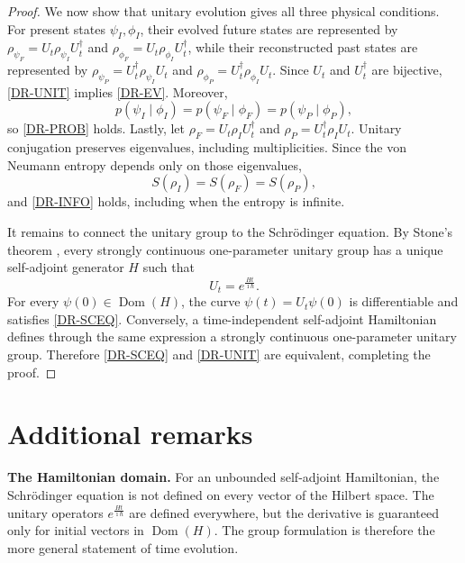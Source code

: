 \documentclass{techbrief}
\providecommand{\Dom}{\operatorname{Dom}}
\begin{document}
\begin{proof}
	We now show that unitary evolution gives all three physical conditions. For present states $\psi_I,\phi_I$, their evolved future states are represented by $\rho_{\psi_F}=U_t\rho_{\psi_I}U_t^\dagger$ and $\rho_{\phi_F}=U_t\rho_{\phi_I}U_t^\dagger$, while their reconstructed past states are represented by $\rho_{\psi_P}=U_t^\dagger\rho_{\psi_I}U_t$ and $\rho_{\phi_P}=U_t^\dagger\rho_{\phi_I}U_t$. Since $U_t$ and $U_t^\dagger$ are bijective, \ref{DR-UNIT} implies \ref{DR-EV}. Moreover,
	\begin{equation}
		p(\psi_I\mid\phi_I)=p(\psi_F\mid\phi_F)=p(\psi_P\mid\phi_P),
	\end{equation}
	so \ref{DR-PROB} holds. Lastly, let $\rho_F=U_t\rho_IU_t^\dagger$ and $\rho_P=U_t^\dagger\rho_IU_t$. Unitary conjugation preserves eigenvalues, including multiplicities. Since the von Neumann entropy depends only on those eigenvalues,
	\begin{equation}
		S(\rho_I)=S(\rho_F)=S(\rho_P),
	\end{equation}
	and \ref{DR-INFO} holds, including when the entropy is infinite.

	It remains to connect the unitary group to the Schrödinger equation. By Stone's theorem \cite[Theorem~5.73]{Landsman2017}, every strongly continuous one-parameter unitary group has a unique self-adjoint generator $H$ such that
	\begin{equation}
		U_t=e^{\frac{Ht}{\imath \hbar}}.
	\end{equation}
	For every $\psi(0)\in\Dom(H)$, the curve $\psi(t)=U_t\psi(0)$ is differentiable and satisfies \ref{DR-SCEQ}. Conversely, a time-independent self-adjoint Hamiltonian defines through the same expression a strongly continuous one-parameter unitary group. Therefore \ref{DR-SCEQ} and \ref{DR-UNIT} are equivalent, completing the proof.
\end{proof}


\section{Additional remarks}

\textbf{The Hamiltonian domain.} For an unbounded self-adjoint Hamiltonian, the Schrödinger equation is not defined on every vector of the Hilbert space. The unitary operators $e^{\frac{Ht}{\imath \hbar}}$ are defined everywhere, but the derivative is guaranteed only for initial vectors in $\Dom(H)$. The group formulation is therefore the more general statement of time evolution.
\end{document}
